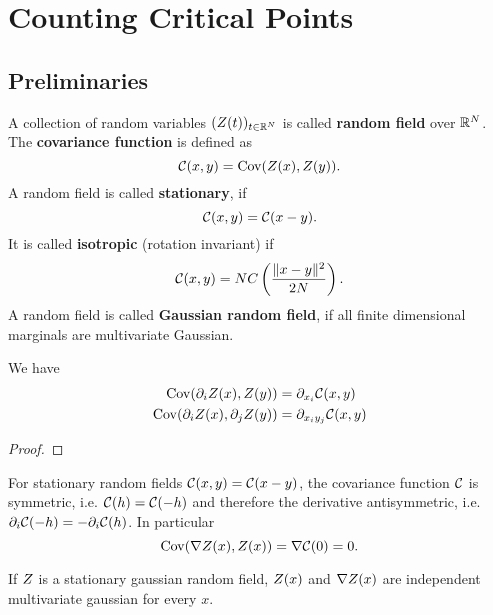\section{Counting Critical Points}

\subsection{Preliminaries}

\begin{definition}
	A collection of random variables \((Z(t))_{t\in\mathbb{R}^N}\) is called
	\textbf{random field} over \(\mathbb{R}^N\). The \textbf{covariance function}
	is defined as
	\begin{equation*}
		\mathcal{C}(x,y) = \operatorname{Cov}(Z(x), Z(y)).
	\end{equation*}
	A random field is called \textbf{stationary}, if
	\begin{equation*}
		\mathcal{C}(x,y) = \mathcal{C}(x-y).
	\end{equation*}
	It is called \textbf{isotropic} (rotation invariant) if	
	\begin{equation*}
		\mathcal{C}(x,y) = N C\left(\frac{\|x-y\|^2}{2N}\right).
	\end{equation*}
	A random field is called \textbf{Gaussian random field}, if all finite
	dimensional marginals are multivariate Gaussian.
\end{definition}

\begin{lemma}
	\label{lem: covariance of derivative}
	We have
	\begin{align*}
		\operatorname{Cov}(\partial_iZ(x), Z(y)) &= \partial_{x_i} \mathcal{C}(x,y)\\
		\operatorname{Cov}(\partial_iZ(x), \partial_j Z(y)) &= \partial_{x_i y_j} \mathcal{C}(x,y)
	\end{align*}
\end{lemma}
\begin{proof}
\end{proof}
\begin{remark}\label{rem: covariance uncorrelated}
	For stationary random fields \(\mathcal{C}(x,y)=\mathcal{C}(x-y)\), the covariance
	function \(\mathcal{C}\) is symmetric, i.e. \(\mathcal{C}(h)=\mathcal{C}(-h)\)
	and therefore the derivative antisymmetric, i.e.
	\(\partial_i\mathcal{C}(-h)=-\partial_i\mathcal{C}(h)\). In particular
	\begin{equation*}
		\operatorname{Cov}(\nabla Z(x), Z(x)) = \nabla \mathcal{C}(0)=0.
	\end{equation*}
\end{remark}
\begin{corollary}
	If \(Z\) is a stationary gaussian random field, \(Z(x)\) and
	\(\nabla Z(x)\) are independent multivariate gaussian for every \(x\).
\end{corollary}


